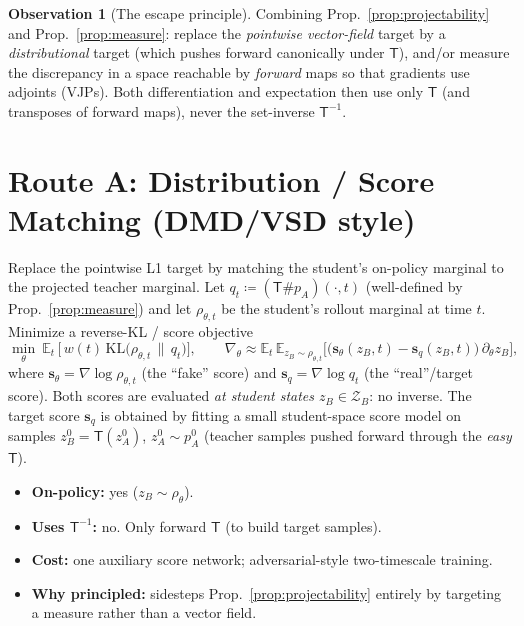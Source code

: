 \documentclass[11pt,a4paper]{article}
\newcommand{\E}{\mathbb{E}}
\newcommand{\KL}{\mathrm{KL}}
\newcommand{\Zb}{\mathcal{Z}_{B}}
\newcommand{\Tmap}{\mathsf{T}}
\newcommand{\Tinv}{\mathsf{T}^{-1}}
\newcommand{\push}{\#}
\newcommand{\score}{\mathbf{s}}
\theoremstyle{definition}
\newtheorem{observation}{Observation}
\begin{document}
\begin{observation}[The escape principle]
\label{obs:principle}
Combining Prop.~\ref{prop:projectability} and Prop.~\ref{prop:measure}: replace the
\emph{pointwise vector-field} target by a \emph{distributional} target (which pushes forward
canonically under $\Tmap$), and/or measure the discrepancy in a space reachable by
\emph{forward} maps so that gradients use adjoints (VJPs). Both differentiation and expectation
then use only $\Tmap$ (and transposes of forward maps), never the set-inverse $\Tinv$.
\end{observation}

\section{Route A: Distribution / Score Matching (DMD/VSD style)}
\label{sec:routeA}

Replace the pointwise L1 target by matching the student's on-policy marginal to the projected
teacher marginal. Let $q_t\coloneqq(\Tmap\push p_A)(\cdot,t)$ (well-defined by
Prop.~\ref{prop:measure}) and let $\rho_{\theta,t}$ be the student's rollout marginal at time
$t$. Minimize a reverse-KL / score objective
\begin{equation}
\min_\theta\ \E_t\,\big[\,w(t)\,\KL\!\big(\rho_{\theta,t}\,\big\|\,q_t\big)\big],
\qquad
\nabla_\theta \approx
\E_t\,\E_{z_B\sim\rho_{\theta,t}}\!\Big[\big(\score_{\theta}(z_B,t)-\score_{q}(z_B,t)\big)\,\partial_\theta z_B\Big],
\label{eq:dmd}
\end{equation}
where $\score_{\theta}=\nabla\log\rho_{\theta,t}$ (the ``fake'' score) and
$\score_{q}=\nabla\log q_t$ (the ``real''/target score). Both scores are evaluated
\emph{at student states $z_B\in\Zb$}: no inverse. The target score $\score_q$ is obtained by
fitting a small student-space score model on samples $z_B^0=\Tmap(z_A^0)$, $z_A^0\sim p_A^0$
(teacher samples pushed forward through the \emph{easy} $\Tmap$).
\begin{itemize}[leftmargin=1.4em,itemsep=2pt]
  \item \textbf{On-policy:} yes ($z_B\sim\rho_\theta$).
  \item \textbf{Uses $\Tinv$:} no. Only forward $\Tmap$ (to build target samples).
  \item \textbf{Cost:} one auxiliary score network; adversarial-style two-timescale training.
  \item \textbf{Why principled:} sidesteps Prop.~\ref{prop:projectability} entirely by targeting
        a measure rather than a vector field.
\end{itemize}
\end{document}
